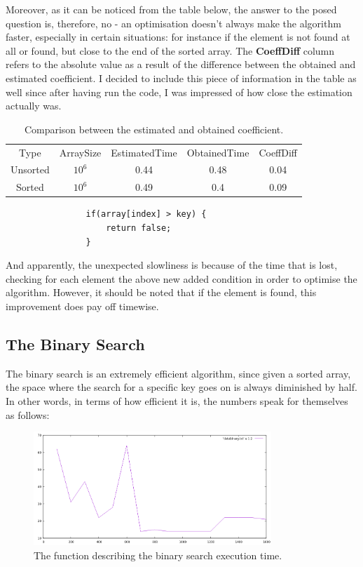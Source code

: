 \documentclass[a4paper,11pt]{article}
\begin{document}
Moreover, as it can be noticed from the table below, the answer to the posed question is, 
therefore, no - an optimisation doesn't always make the algorithm faster, especially in certain situations: for instance 
if the element is not found at all or found, but close to the end of the sorted array. The \textbf{CoeffDiff} column refers to the 
absolute value as a result of the difference 
between the obtained and estimated coefficient. I decided to include this piece of information in the table as well since
after having run the code, I was impressed of how close the estimation actually was.

\begin{table}[h!]
    \centering
    \begin{tabular}{||c c c c c||} 
    \hline
    Type & ArraySize & EstimatedTime &  ObtainedTime & CoeffDiff\\ [0.5ex]
    Unsorted & $10^6$ & 0.44 & 0.48 & 0.04 \\
    Sorted & $10^6$ & 0.49 & 0.4 & 0.09\\ [1ex] 
    \hline
    \end{tabular}
    \caption{Comparison between the estimated and obtained coefficient.} 
    \label{table:1}
\end{table}

\begin{verbatim}
                if(array[index] > key) {
                    return false;
                } 
\end{verbatim}


And apparently, the unexpected slowliness is because of the time that is lost, checking for each element the above new added condition
in order to optimise the algorithm. However, it should be noted that if the element is found,
this improvement does pay off timewise.

\subsection*{The Binary Search}

The binary search is an extremely efficient algorithm, since given a sorted array,
the space where the search for a specific key goes on is always diminished by half.
In other words, in terms of how efficient it is, the numbers speak for themselves as follows:

\begin{figure}[ht]
    \centering
    \includegraphics[width=0.8\textwidth]{plotbinary.png}
    \caption{The function describing the binary search execution time.}
    \label{fig:2}
\end{figure}
\end{document}

